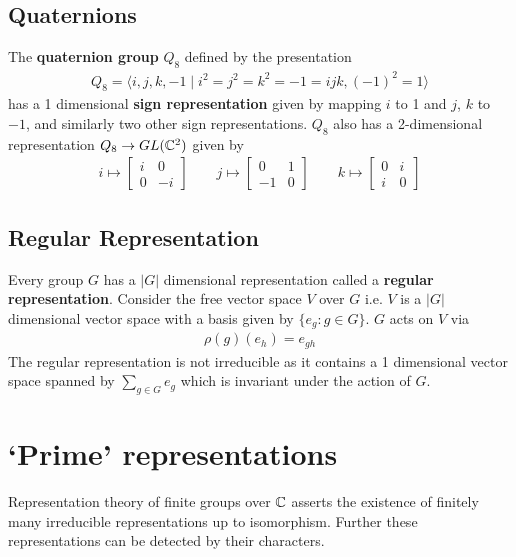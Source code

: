 \subsection{Quaternions}
The \textbf{quaternion group} $Q_8$ defined by the presentation
\begin{align}
	Q_8 = \langle i,j,k, -1 \mid i^2 = j^2 = k^2 = -1 = ijk, (-1)^2 = 1  \rangle
\end{align}
has a 1 dimensional \textbf{sign representation} given by mapping $i$ to 1 and $j$, $k$ to $-1$, and similarly two other sign representations. $Q_8$ also has a 2-dimensional representation $Q_8 \rightarrow GL(\mathbb{C}^2)$ given by
\begin{align}
	i \mapsto \begin{bmatrix} i & 0 \\ 0 & -i \end{bmatrix}
	\qquad
	j \mapsto \begin{bmatrix} 0 & 1 \\ -1 & 0 \end{bmatrix}
	\qquad
	k \mapsto \begin{bmatrix} 0 & i \\ i & 0 \end{bmatrix}
\end{align}

\subsection{Regular Representation}
Every group $G$ has a $|G|$ dimensional representation called a \textbf{regular representation}. Consider the free vector space $V$ over $G$ i.e. $V$ is a $|G|$ dimensional vector space with a basis given by $\{ e_g : g \in G\}$. $G$ acts on $V$ via
\begin{align}
	\rho(g)(e_h) = e_{gh}
\end{align}
The regular representation is not irreducible as it contains a 1 dimensional vector space spanned by $\sum _ {g \in G} e_g$ which is invariant under the action of $G$.












\section{`Prime' representations}
Representation theory of finite groups over $\mathbb{C}$ asserts the existence of finitely many irreducible representations up to isomorphism. Further these representations can be detected by their characters.

